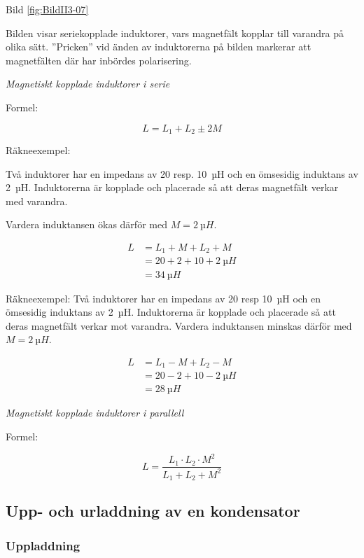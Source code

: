 Bild \ref{fig:BildII3-07}

Bilden visar seriekopplade induktorer, vars magnetfält kopplar till varandra på
olika sätt. ''Pricken'' vid änden av induktorerna på bilden markerar att
magnetfälten där har inbördes polarisering.

\emph{Magnetiskt kopplade induktorer i serie}

Formel:

\[L = L_1 +L_2 \pm 2M\]

Räkneexempel:

Två induktorer har en impedans av 20 resp. 10~µH och en ömsesidig induktans av
2~µH. Induktorerna är kopplade och placerade så att deras magnetfält verkar med
varandra.

Vardera induktansen ökas därför med \(M = 2\ µH\).

\begin{align*}
  L &= L_1 + M + L_2 + M \\
  &= 20 + 2 + 10 + 2\ µH \\
  &= 34\ µH
\end{align*}

Räkneexempel:
Två induktorer har en impedans av 20 resp 10~µH och en ömsesidig induktans av
2~µH. Induktorerna är kopplade och placerade så att deras magnetfält verkar mot
varandra. Vardera induktansen minskas därför med \(M = 2\ µH\).

\begin{align*}
  L &= L_1 - M + L_2 - M \\
  & = 20 - 2 + 10 - 2\ µH \\
  &= 28\ µH
\end{align*}

\emph{Magnetiskt kopplade induktorer i parallell}

Formel:

\[L = \frac{L_1 \cdot L_2 \cdot M^2}{L_1 + L_2 + M^2}\]

\subsection{Upp- och urladdning av en kondensator}

\subsubsection{Uppladdning}

